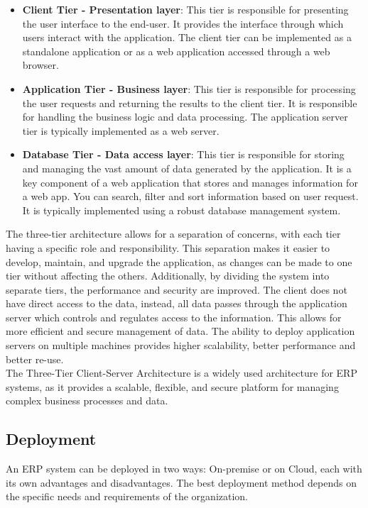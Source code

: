 \begin{itemize}
    \item \textbf{Client Tier - Presentation layer}: This tier is responsible for presenting the user interface to the end-user. It provides the interface through which users interact with the application. The client tier can be implemented as a standalone application or as a web application accessed through a web browser.
    \item \textbf{Application Tier - Business layer}: This tier is responsible for processing the user requests and returning the results to the client tier. It is responsible for handling the business logic and data processing. The application server tier is typically implemented as a web server.
    \item \textbf{Database Tier - Data access layer}: This tier is responsible for storing and managing the vast amount of data generated by the application. It is a key component of a web application that stores and manages information for a web app. You can search, filter and sort information based on user request. It is typically implemented using a robust database management system.
\end{itemize}
The three-tier architecture allows for a separation of concerns, with each tier having a specific role and responsibility. This separation makes it easier to develop, maintain, and upgrade the application, as changes can be made to one tier without affecting the others. Additionally, by dividing the system into separate tiers, the performance and security are improved. The client does not have direct access to the data, instead, all data passes through the application server which controls and regulates access to the information. This allows for more efficient and secure management of data. The ability to deploy application servers on multiple machines provides higher scalability, better performance and better re-use. \\
The Three-Tier Client-Server Architecture is a widely used architecture for ERP systems, as it provides a scalable, flexible, and secure platform for managing complex business processes and data.


\subsection{Deployment}
An ERP system can be deployed in two ways: On-premise or on Cloud, each with its own advantages and disadvantages. The best deployment method depends on the specific needs and requirements of the organization.


